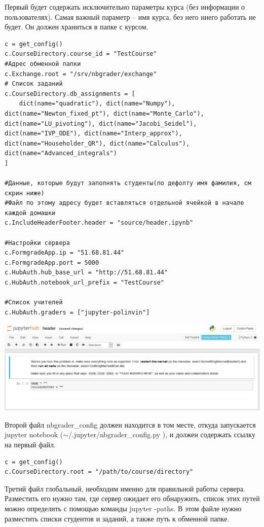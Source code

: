 \documentclass[a4paper,12pt]{article}
\begin{document}
Первый будет содержать исключительно параметры курса (без информации о пользователях). Самая важный параметр -- имя курса, без него ниего работать не будет. Он должен храниться в папке с курсом.
\begin{verbatim}
c = get_config()
c.CourseDirectory.course_id = "TestCourse"
#Адрес обменной папки
c.Exchange.root = "/srv/nbgrader/exchange"
# Список заданий
c.CourseDirectory.db_assignments = [
    dict(name="quadratic"), dict(name="Numpy"), dict(name="Newton_fixed_pt"), dict(name="Monte_Carlo"), dict(name="LU_pivoting"), dict(name="Jacobi_Seidel"), dict(name="IVP_ODE"), dict(name="Interp_approx"), dict(name="Householder_QR"), dict(name="Calculus"), dict(name="Advanced_integrals")
]

#Данные, которые будут заполнять студенты(по дефолту имя фамилия, см скрин ниже)
#Файл по этому адресу будет вставляться отдельной ячейкой в начале каждой домашки
c.IncludeHeaderFooter.header = "source/header.ipynb"

#Настройки сервера
c.FormgradeApp.ip = "51.68.81.44"
c.FormgradeApp.port = 5000
c.HubAuth.hub_base_url = "http://51.68.81.44"
c.HubAuth.notebook_url_prefix = "TestCourse"

#Список учителей
c.HubAuth.graders = ["jupyter-polinvin"]
\end{verbatim}

\includegraphics[width=\textwidth]{header}

Второй файл nbgrader\_config должен находится в том месте, откуда запускается jupyter notebook ($\sim$\slash.jupyter\slash nbgrader\_config.py ), и должен содержать ссылку на первый файл.

\begin{verbatim}
c = get_config()
c.CourseDirectory.root = "/path/to/course/directory"
\end{verbatim}

Третий файл глобальный, необходим именно для правильной работы сервера. Разместить его нужно там, где сервер ожидает его обнаружить, список этих путей можно определить с помощью команды jupyter  -paths. В этом файле нужно разместить списки студентов и заданий, а также путь к обменной папке.
\end{document}
